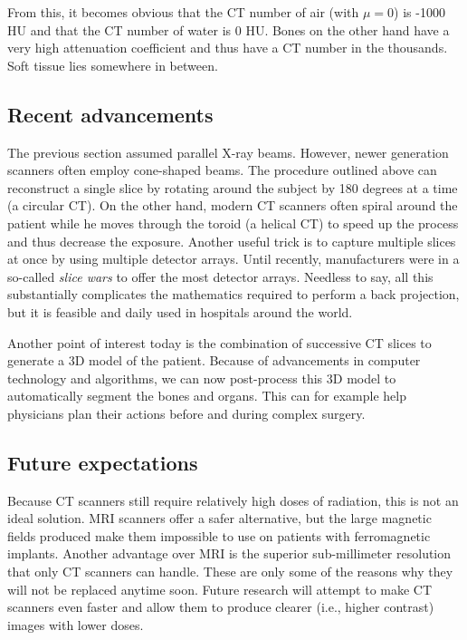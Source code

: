 From this, it becomes obvious that the CT number of air (with $\mu = 0$) is
-1000 HU and that the CT number of water is 0 HU. Bones on the other hand have a
very high attenuation coefficient and thus have a CT number in the thousands.
Soft tissue lies somewhere in between.

\subsection{Recent advancements}
The previous section assumed parallel X-ray beams. However, newer generation
scanners often employ cone-shaped beams. The procedure outlined above can
reconstruct a single slice by rotating around the subject by 180 degrees at a
time (a circular CT). On the other hand, modern CT scanners often spiral around
the patient while he moves through the toroid (a helical CT) to speed up the
process and thus decrease the exposure. Another useful trick is to capture
multiple slices at once by using multiple detector arrays. Until recently,
manufacturers were in a so-called \emph{slice wars} to offer the most detector
arrays. Needless to say, all this substantially complicates the mathematics
required to perform a back projection, but it is feasible and daily used in
hospitals around the world.

Another point of interest today is the combination of successive CT slices to
generate a 3D model of the patient. Because of advancements in computer
technology and algorithms, we can now post-process this 3D model to
automatically segment the bones and organs. This can for example help physicians
plan their actions before and during complex surgery.

\subsection{Future expectations}
Because CT scanners still require relatively high doses of radiation, this is
not an ideal solution. MRI scanners offer a safer alternative, but the large
magnetic fields produced make them impossible to use on patients with ferromagnetic
implants. Another advantage over MRI is the superior sub-millimeter resolution
that only CT scanners can handle. These are only some of the reasons why they
will not be replaced anytime soon. Future research will attempt to make CT scanners
even faster and allow them to produce clearer (i.e., higher contrast) images
with lower doses.


